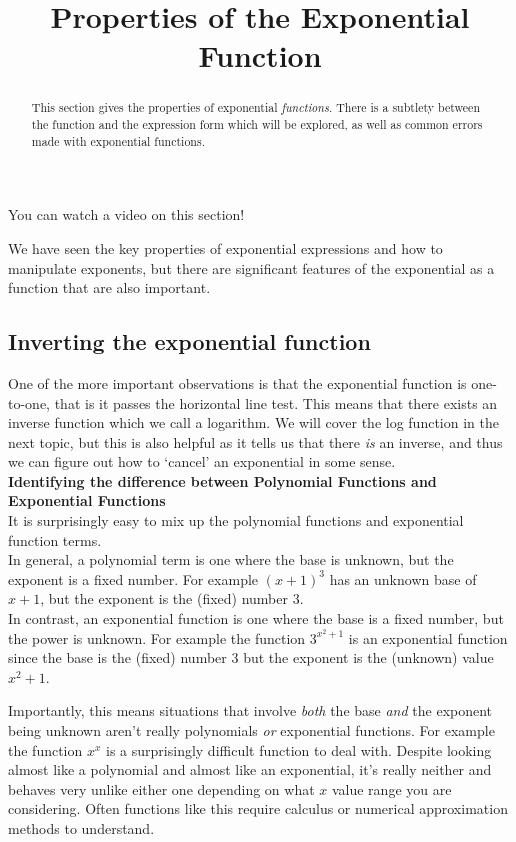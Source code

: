 \documentclass{ximera}
\title{Properties of the Exponential Function}
\begin{document}
\begin{abstract}
    This section gives the properties of exponential \textit{functions}. There is a subtlety between the function and the expression form which will be explored, as well as common errors made with exponential functions.
\end{abstract}
\maketitle

You can watch a video on this section!

    
We have seen the key properties of exponential expressions and how to manipulate exponents, but there are significant features of the exponential as a function that are also important. 

\subsection*{Inverting the exponential function}

    One of the more important observations is that the exponential function is one-to-one, that is it passes the horizontal line test. This means that there exists an inverse function which we call a logarithm. We will cover the log function in the next topic, but this is also helpful as it tells us that there \textit{is} an inverse, and thus we can figure out how to `cancel' an exponential in some sense.\\
    
    {\bfseries Identifying the difference between Polynomial Functions and Exponential Functions}\\%
    
        It is surprisingly easy to mix up the polynomial functions and exponential function terms.\\
        In general, a polynomial term is one where the base is unknown, but the exponent is a fixed number. For example $(x+1)^3$ has an unknown base of $x + 1$, but the exponent is the (fixed) number $3$.\\
        In contrast, an exponential function is one where the base is a fixed number, but the power is unknown. For example the function $3^{x^2+1}$ is an exponential function since the base is the (fixed) number $3$ but the exponent is the (unknown) value $x^2 + 1$.
        
        Importantly, this means situations that involve \textit{both} the base \textit{and} the exponent being unknown aren't really polynomials \textit{or} exponential functions. For example the function $x^x$ is a surprisingly difficult function to deal with. Despite looking almost like a polynomial and almost like an exponential, it's really neither and behaves very unlike either one depending on what $x$ value range you are considering. Often functions like this require calculus or numerical approximation methods to understand.
        
\end{document}

